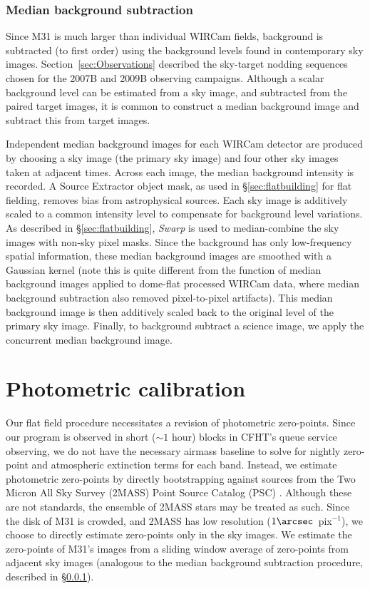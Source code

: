 \documentclass[iop,tighten]{emulateapj}
\newcommand{\sw}[1]{\textit{#1}} %
\newcommand{\Sec}[1]{\S\ref{sec:#1}}  %
\begin{document}
\subsubsection{Median background subtraction}
\label{sec:mediansky}

Since M31 is much larger than individual WIRCam fields, background is subtracted (to first order) using the background levels found in contemporary sky images.
Section~\ref{sec:Observations} described the sky-target nodding sequences chosen for the 2007B and 2009B observing campaigns. 
Although a scalar background level can be estimated from a sky image, and subtracted from the paired target images, it is common to construct a median background image and subtract this from target images.

Independent median background images for each WIRCam detector are produced by choosing a sky image (the primary sky image) and four other sky images taken at adjacent times.
Across each image, the median background intensity is recorded.
A Source Extractor object mask, as used in \Sec{flatbuilding} for flat fielding, removes bias from astrophysical sources.
Each sky image is additively scaled to a common intensity level to compensate for background level variations.
As described in \Sec{flatbuilding}, \sw{Swarp} is used to median-combine the sky images with non-sky pixel masks.
Since the background has only low-frequency spatial information, these median background images are smoothed with a Gaussian kernel (note this is quite different from the function of median background images applied to dome-flat processed WIRCam data, where median background subtraction also removed pixel-to-pixel artifacts).
This median background image is then additively scaled back to the original level of the primary sky image.
Finally, to background subtract a science image, we apply the concurrent median background image.

\section{Photometric calibration}
\label{sec:photocal}

Our flat field procedure necessitates a revision of photometric zero-points.
Since our program is observed in short ($\sim 1$ hour) blocks in CFHT's queue service observing, we do not have the necessary airmass baseline to solve for nightly zero-point and atmospheric extinction terms for each band.
Instead, we estimate photometric zero-points by directly bootstrapping against sources from the Two Micron All Sky Survey (2MASS) Point Source Catalog (PSC) \citep{Skrutskie:2006}.
Although these are not standards, the ensemble of 2MASS stars may be treated as such.
Since the disk of M31 is crowded, and 2MASS has low resolution ($1\arcsec$~pix$^{-1}$), we choose to directly estimate zero-points only in the sky images.
We estimate the zero-points of M31's images from a sliding window average of zero-points from adjacent sky images (analogous to the median background subtraction procedure, described in \Sec{mediansky}).
\end{document}
